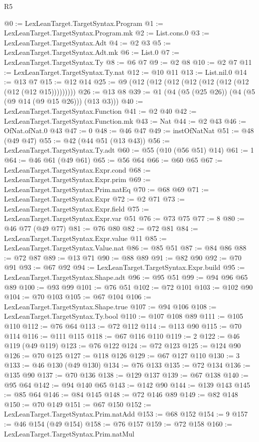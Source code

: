 \begin{lexlean}{R5}
\begin{coremodule}
@0 := LexLeanTarget.TargetSyntax.Program
@1 := LexLeanTarget.TargetSyntax.Program.mk
@2 := List.cons.{0}
@3 := LexLeanTarget.TargetSyntax.Adt
@4 := @2 @3
@5 := LexLeanTarget.TargetSyntax.Adt.mk
@6 := List.{0}
@7 := LexLeanTarget.TargetSyntax.Ty
@8 := @6 @7
@9 := @2 @8
@10 := @2 @7
@11 := LexLeanTarget.TargetSyntax.Ty.nat
@12 := @10 @11
@13 := List.nil.{0}
@14 := @13 @7
@15 := @12 @14
@25 := @9 (@12 (@12 (@12 (@12 (@12 (@12 (@12 (@12 (@12 @15)))))))))
@26 := @13 @8
@39 := @1 (@4 (@5 (@25 @26)) (@4 (@5 (@9 @14 (@9 @15 @26))) (@13 @3)))
@40 := LexLeanTarget.TargetSyntax.Function
@41 := @2 @40
@42 := LexLeanTarget.TargetSyntax.Function.mk
@43 := Nat
@44 := @2 @43
@46 := OfNat.ofNat.{0} @43
@47 := 0
@48 := @46 @47
@49 := instOfNatNat
@51 := @48 (@49 @47)
@55 := @42 (@44 @51 (@13 @43))
@56 := LexLeanTarget.TargetSyntax.Ty.adt
@60 := @55 (@10 (@56 @51) @14)
@61 := 1
@64 := @46 @61 (@49 @61)
@65 := @56 @64
@66 := @60 @65
@67 := LexLeanTarget.TargetSyntax.Expr.cond
@68 := LexLeanTarget.TargetSyntax.Expr.prim
@69 := LexLeanTarget.TargetSyntax.Prim.natEq
@70 := @68 @69
@71 := LexLeanTarget.TargetSyntax.Expr
@72 := @2 @71
@73 := LexLeanTarget.TargetSyntax.Expr.field
@75 := LexLeanTarget.TargetSyntax.Expr.var @51
@76 := @73 @75
@77 := 8
@80 := @46 @77 (@49 @77)
@81 := @76 @80
@82 := @72 @81
@84 := LexLeanTarget.TargetSyntax.Expr.value @11
@85 := LexLeanTarget.TargetSyntax.Value.nat
@86 := @85 @51
@87 := @84 @86
@88 := @72 @87
@89 := @13 @71
@90 := @88 @89
@91 := @82 @90
@92 := @70 @91
@93 := @67 @92
@94 := LexLeanTarget.TargetSyntax.Expr.build
@95 := LexLeanTarget.TargetSyntax.Shape.adt
@96 := @95 @51
@99 := @94 @96 @65 @89
@100 := @93 @99
@101 := @76 @51
@102 := @72 @101
@103 := @102 @90
@104 := @70 @103
@105 := @67 @104
@106 := LexLeanTarget.TargetSyntax.Shape.true
@107 := @94 @106
@108 := LexLeanTarget.TargetSyntax.Ty.bool
@110 := @107 @108 @89
@111 := @105 @110
@112 := @76 @64
@113 := @72 @112
@114 := @113 @90
@115 := @70 @114
@116 := @111 @115
@118 := @67 @116 @110
@119 := 2
@122 := @46 @119 (@49 @119)
@123 := @76 @122
@124 := @72 @123
@125 := @124 @90
@126 := @70 @125
@127 := @118 @126
@129 := @67 @127 @110
@130 := 3
@133 := @46 @130 (@49 @130)
@134 := @76 @133
@135 := @72 @134
@136 := @135 @90
@137 := @70 @136
@138 := @129 @137
@139 := @67 @138
@140 := @95 @64
@142 := @94 @140 @65
@143 := @142 @90
@144 := @139 @143
@145 := @85 @64
@146 := @84 @145
@148 := @72 @146 @89
@149 := @82 @148
@150 := @70 @149
@151 := @67 @150
@152 := LexLeanTarget.TargetSyntax.Prim.natAdd
@153 := @68 @152
@154 := 9
@157 := @46 @154 (@49 @154)
@158 := @76 @157
@159 := @72 @158
@160 := LexLeanTarget.TargetSyntax.Prim.natMul

\end{coremodule}
\end{lexlean}
